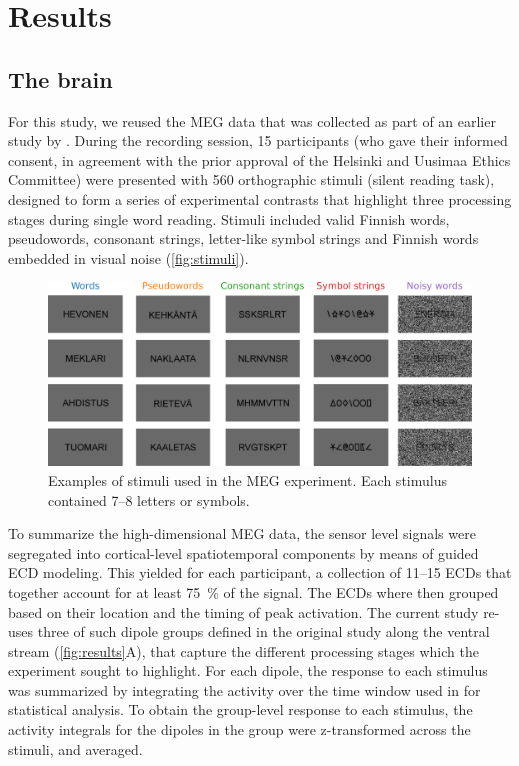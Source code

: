 \documentclass[a4paper, 10pt]{vanvliet_paper}
\begin{document}
\section{Results}

\subsection{The brain}

For this study, we reused the \gls{MEG} data that was collected as part of an earlier study by \textcite{Vartiainen2011}.
During the recording session, 15 participants (who gave their informed consent, in agreement with the prior approval of the Helsinki and Uusimaa Ethics Committee) were presented with 560 orthographic stimuli (silent reading task), designed to form a series of experimental contrasts that highlight three processing stages during single word reading.
Stimuli included valid Finnish words, pseudowords, consonant strings, letter-like symbol strings and Finnish words embedded in visual noise (\autoref{fig:stimuli}).

\begin{figure}
    \includegraphics[width=\textwidth]{stimuli.pdf}
    \caption{Examples of stimuli used in the \gls{MEG} experiment. Each stimulus contained 7--8 letters or symbols.}\label{fig:stimuli}
\end{figure}

To summarize the high-dimensional \gls{MEG} data, the sensor level signals were segregated into cortical-level spatiotemporal components by means of guided \gls{ECD} modeling\cite{Hamalainen1993}.
This yielded for each participant, a collection of 11--15 \glspl{ECD} that together account for at least \SI{75}{\percent} of the signal.
The \glspl{ECD} where then grouped based on their location and the timing of peak activation. 
The current study re-uses three of such dipole groups defined in the original study\cite{Vartiainen2011} along the ventral stream (\autoref{fig:results}A), that capture the different processing stages which the experiment sought to highlight.
For each dipole, the response to each stimulus was summarized by integrating the activity over the time window used in \textcite{Vartiainen2011} for statistical analysis.
To obtain the group-level response to each stimulus, the activity integrals for the dipoles in the group were z-transformed across the stimuli, and averaged.
\end{document}
